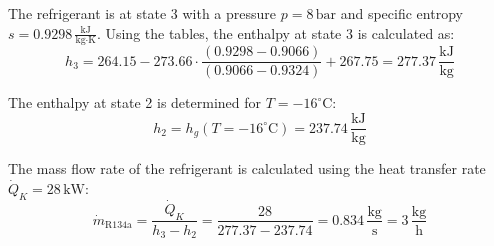 The refrigerant is at state 3 with a pressure \( p = 8 \, \text{bar} \) and specific entropy \( s = 0.9298 \, \frac{\text{kJ}}{\text{kg·K}} \). Using the tables, the enthalpy at state 3 is calculated as:  
\[
h_3 = 264.15 - 273.66 \cdot \frac{(0.9298 - 0.9066)}{(0.9066 - 0.9324)} + 267.75 = 277.37 \, \frac{\text{kJ}}{\text{kg}}
\]

The enthalpy at state 2 is determined for \( T = -16^\circ \text{C} \):  
\[
h_2 = h_g(T = -16^\circ \text{C}) = 237.74 \, \frac{\text{kJ}}{\text{kg}}
\]

The mass flow rate of the refrigerant is calculated using the heat transfer rate \( \dot{Q}_K = 28 \, \text{kW} \):  
\[
\dot{m}_{\text{R134a}} = \frac{\dot{Q}_K}{h_3 - h_2} = \frac{28}{277.37 - 237.74} = 0.834 \, \frac{\text{kg}}{\text{s}} = 3 \, \frac{\text{kg}}{\text{h}}
\]